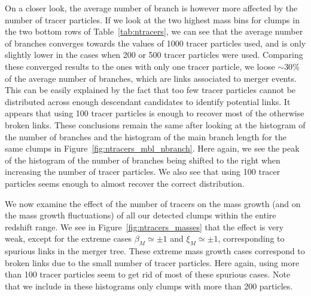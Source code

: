 On a closer look, the average number of branch is however more
affected by the number of tracer particles. If we look at the two highest
mass bins for clumps in the two bottom rows of Table~\ref{tab:ntracers},
we can see that the average number of branches converges towards
the values of 1000 tracer particles used, and is only slightly lower in
the cases when 200 or 500 tracer particles were used. Comparing these
converged results to the ones with only one tracer particle, 
we loose $\sim 30\%$ of the average number of branches, which are 
links associated to merger events.  This
can be easily explained by the fact that too few tracer particles
cannot be distributed across enough descendant candidates to identify
potential links. It appears that using 100 tracer particles is enough 
to recover most of the otherwise broken links. These
conclusions remain the same after looking at the histogram of the
number of branches and the histogram of the main branch length for the
same clumps in Figure~\ref{fig:ntracers_mbl_nbranch}. Here again, we
see the peak of the histogram of the number of branches being shifted
to the right when increasing the number of tracer particles. We also
see that using 100 tracer particles seems enough to almost recover the
correct distribution.

We now examine the effect of the number of tracers on the mass growth
(and on the mass growth fluctuations) of all our detected clumps
within the entire redshift range. We see in
Figure~\ref{fig:ntracers_masses} that the effect is very weak, except
for the extreme cases $\beta_M \simeq \pm 1$ and $\xi_M \simeq \pm 1$,
corresponding to spurious links in the merger tree. These extreme mass 
growth cases correspond to broken links due to the
small number of tracer particles. Here again, using more than 100
tracer particles seem to get rid of most of these spurious cases.
Note that we include in these histograms only clumps with more than
200 particles.

